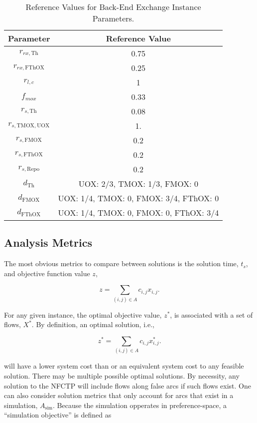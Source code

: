 \begin{table}[h!]
\centering
\caption{Reference Values for Back-End Exchange Instance Parameters.}
\label{tbl:back_ref_params}
\begin{tabular}{|c|c|}
\hline
Parameter    & Reference Value
\\ \hline
$r_{rx, \text{Th}}$   & 0.75 
\\ \hline
$r_{rx, \text{FThOX}}$ & 0.25
\\ \hline
$r_{l, c}$ & 1
\\ \hline
$f_{mox}$     & 0.33
\\ \hline
$r_{s, \text{Th}}$ & 0.08
\\ \hline
$r_{s, \text{TMOX}, \text{UOX}}$ & 1.
\\ \hline
$r_{s, \text{FMOX}}$ & 0.2
\\ \hline
$r_{s, \text{FThOX}}$ & 0.2
\\ \hline
$r_{s, \text{Repo}}$   & 0.2
\\ \hline
$d_{\text{Th}}$   & {UOX: 2/3, TMOX: 1/3, FMOX: 0}
\\ \hline
$d_{\text{FMOX}}$   & {UOX: 1/4, TMOX: 0, FMOX: 3/4, FThOX: 0}
\\ \hline
$d_{\text{FThOX}}$   & {UOX: 1/4, TMOX: 0, FMOX: 0, FThOX: 3/4}
\\ \hline
\end{tabular}
\end{table}

\subsection{Analysis Metrics}

The most obvious metrics to compare between solutions is the solution time,
$t_s$, and objective function value $z$,

\begin{equation}\label{eqn:obj_flow}
z = \sum_{(i, j) \in A} c_{i, j} x_{i, j}.
\end{equation}

\noindent
For any given instance, the optimal objective value, $z^*$, is associated with a
set of flows, $X^*$. By definition, an optimal solution, i.e., 

\begin{equation}\label{eqn:obj_flow}
z^* = \sum_{(i, j) \in A} c_{i, j} x^*_{i, j}.
\end{equation}

\noindent
 will have a lower system cost than or an equivalent system cost to any feasible
 solution. There may be multiple possible optimal solutions. By necessity, any
 solution to the NFCTP will include flows along false arcs if such flows
 exist. One can also consider solution metrics that only account for arcs that
 exist in a simulation, $A_{\text{sim}}$. Because the simulation opperates in
 preference-space, a ``simulation objective'' is defined as

